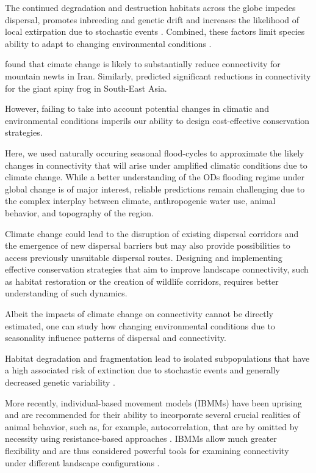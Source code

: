 \documentclass[abstract=on,10pt,a4paper,bibliography=totocnumbered]{article}
\begin{document}
The continued degradation and destruction habitats across the globe impedes
dispersal, promotes inbreeding and genetic drift and increases the
likelihood of local extirpation due to stochastic events \citep{Sawyer.2011}.
Combined, these factors limit species ability to adapt to changing environmental
conditions \citep{Fahrig.2003}.

\cite{Ashrafzadeh.2019} found that cimate change is likely to substantially
reduce connectivity for mountain newts in Iran. Similarly, \cite{Luo.2021}
predicted significant reductions in connectivity for the giant spiny frog in
South-East Asia.

However, failing to take into account potential changes in climatic and
environmental conditions imperils our ability to design cost-effective
conservation strategies.

Here, we used naturally occuring seasonal flood-cycles to approximate the likely
changes in connectivity that will arise under amplified climatic conditions due
to climate change. While a better understanding of the ODs flooding regime under global change is of major interest, reliable predictions remain challenging due to the complex interplay between climate,
anthropogenic water use, animal behavior, and topography of the region.

Climate change
could lead to the disruption of existing dispersal corridors and the emergence
of new dispersal barriers but may also provide possibilities to access
previously unsuitable dispersal routes. Designing and implementing effective
conservation strategies that aim to improve landscape connectivity, such as
habitat restoration or the creation of wildlife corridors, requires better
understanding of such dynamics.

Albeit the impacts of climate change on connectivity cannot be directly
estimated, one can study how changing environmental conditions due to
seasonality influence patterns of dispersal and connectivity.

Habitat degradation and fragmentation lead to isolated subpopulations that have
a high associated risk of extinction due to stochastic events and generally
decreased genetic variability \citep{Melbourne.2008}.

More recently, individual-based movement models (IBMMs) have been uprising and
are recommended for their ability to incorporate several crucial realities of
animal behavior, such as, for example, autocorrelation, that are by omitted by
necessity using resistance-based approaches \citep{Hofmann.2023,
Unnithan.2022a}. IBMMs allow much greater flexibility and are thus considered
powerful tools for examining connectivity under different landscape
configurations \citep{Littlefield.2019}.
\end{document}
